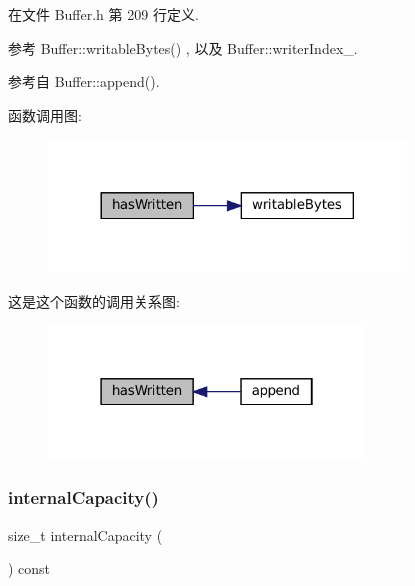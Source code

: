 在文件 Buffer.\+h 第 209 行定义.



参考 Buffer\+::writable\+Bytes() , 以及 Buffer\+::writer\+Index\+\_\+.



参考自 Buffer\+::append().

函数调用图\+:
\nopagebreak
\begin{figure}[H]
\begin{center}
\leavevmode
\includegraphics[width=269pt]{classmuduo_1_1net_1_1Buffer_ae29d7ca8954d0ec7da6363221c80a245_cgraph}
\end{center}
\end{figure}
这是这个函数的调用关系图\+:
\nopagebreak
\begin{figure}[H]
\begin{center}
\leavevmode
\includegraphics[width=238pt]{classmuduo_1_1net_1_1Buffer_ae29d7ca8954d0ec7da6363221c80a245_icgraph}
\end{center}
\end{figure}
\mbox{\label{classmuduo_1_1net_1_1Buffer_add5064782687c36289ea4905a58caef2}} 
\subsubsection{\texorpdfstring{internal\+Capacity()}{internalCapacity()}}
{\footnotesize\ttfamily size\+\_\+t internal\+Capacity (\begin{DoxyParamCaption}{ }\end{DoxyParamCaption}) const\hspace{0.3cm}{\ttfamily [inline]}}



